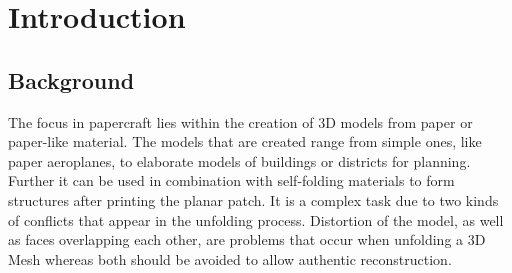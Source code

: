 \documentclass[draft,final]{vutinfth} %
\begin{document}
\frontmatter %

\addstatementpage

\begin{danksagung*}
\end{danksagung*}

\begin{acknowledgements*}
\end{acknowledgements*}

\begin{kurzfassung}
\end{kurzfassung}

\begin{abstract}
\end{abstract}


\tableofcontents %

\mainmatter

\chapter{Introduction}

\section{Background}
The focus in papercraft lies within the creation of 3D models from paper or paper-like material. The models that are created range from simple ones, like paper aeroplanes, to elaborate models of buildings or districts for planning. Further it can be used in combination with self-folding materials to form structures after printing the planar patch. It is a complex task due to two kinds of conflicts that appear in the unfolding process. Distortion of the model, as well as faces overlapping each other, are problems that occur when unfolding a 3D Mesh whereas both should be avoided to allow authentic reconstruction.
\end{document}
